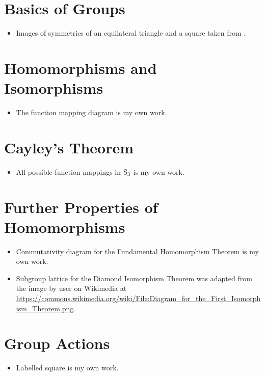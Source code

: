 \section{Basics of Groups}
\begin{itemize}
    \item Images of symmetries of an equilateral triangle and a square taken from \cite[p. 13]{milne_2021}.
\end{itemize}

\section{Homomorphisms and Isomorphisms}
\begin{itemize}
    \item The function mapping diagram is my own work.
\end{itemize}

\section{Cayley's Theorem}
\begin{itemize}
    \item All possible function mappings in $\mathrm{S}_{3}$ is my own work.
\end{itemize}

\section{Further Properties of Homomorphisms}
\begin{itemize}
    \item Commutativity diagram for the Fundamental Homomorphism Theorem is my own work.
    \item Subgroup lattice for the Diamond Isomorphism Theorem was adapted from the image by user  on Wikimedia at \url{https://commons.wikimedia.org/wiki/File:Diagram_for_the_First_Isomorphism_Theorem.png}.
\end{itemize}

\section{Group Actions}
\begin{itemize}
    \item Labelled square is my own work.
\end{itemize}

\printbibliography[heading=bibintoc, title={References and Bibliography}]


